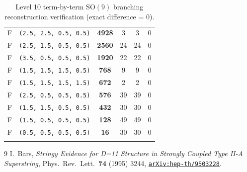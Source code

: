 \documentclass[11pt,a4paper]{article}
\begin{document}
\begin{longtable}{@{}cccccc@{}}
F & \texttt{(2.5, 2.5, 0.5, 0.5)} & \textbf{4928} & 3 & 3 & 0 \\
F & \texttt{(2.5, 1.5, 0.5, 0.5)} & \textbf{2560} & 24 & 24 & 0 \\
F & \texttt{(3.5, 0.5, 0.5, 0.5)} & \textbf{1920} & 22 & 22 & 0 \\
F & \texttt{(1.5, 1.5, 1.5, 0.5)} & \textbf{768} & 9 & 9 & 0 \\
F & \texttt{(1.5, 1.5, 1.5, 1.5)} & \textbf{672} & 2 & 2 & 0 \\
F & \texttt{(2.5, 0.5, 0.5, 0.5)} & \textbf{576} & 39 & 39 & 0 \\
F & \texttt{(1.5, 1.5, 0.5, 0.5)} & \textbf{432} & 30 & 30 & 0 \\
F & \texttt{(1.5, 0.5, 0.5, 0.5)} & \textbf{128} & 49 & 49 & 0 \\
F & \texttt{(0.5, 0.5, 0.5, 0.5)} & \textbf{16} & 30 & 30 & 0 \\
\bottomrule
\caption{Level 10 term-by-term $\mathrm{SO}(9)$ branching reconstruction verification (exact difference = 0).}
\end{longtable}

\begin{thebibliography}{9}
 I.~Bars, \emph{Stringy Evidence for D=11 Structure in Strongly Coupled Type II-A Superstring}, Phys.\ Rev.\ Lett.\ \textbf{74} (1995) 3244, \href{https://arxiv.org/abs/hep-th/9503228}{\texttt{arXiv:hep-th/9503228}}.
\end{thebibliography}
\end{document}
